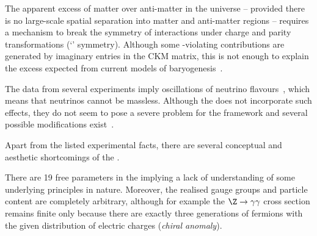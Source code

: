 The apparent excess of matter over anti-matter in the universe -- provided there is no large-scale spatial separation into matter and anti-matter regions -- requires a mechanism to break the symmetry of \sm interactions under charge and parity transformations (`\cp' symmetry).
Although some \cp-violating contributions are generated by imaginary entries in the CKM matrix, this is not enough to explain the excess expected from current models of baryogenesis~\cite{bib:CPViolation}. 

The data from several experiments imply oscillations of neutrino flavours~\cite{Fukuda:1998mi,bib:Neutrinos}, which means that neutrinos cannot be massless.
Although the \sm does not incorporate such effects, they do not seem to pose a severe problem for the framework and several possible modifications exist~\cite{bib:Majorana,1968JETP...26..984P,Minkowski:1977sc}.

Apart from the listed experimental facts, there are several conceptual and aesthetic shortcomings of the \sm.

There are 19 free parameters in the \sm implying a lack of understanding of some underlying principles in nature.
Moreover, the realised gauge groups and particle content are completely arbitrary, although for example the \mbox{$\Z\rightarrow\gamma\gamma$} cross section remains finite only because there are exactly three generations of fermions with the given distribution of electric charges (\emph{chiral anomaly}\tobechecked)\addref.


